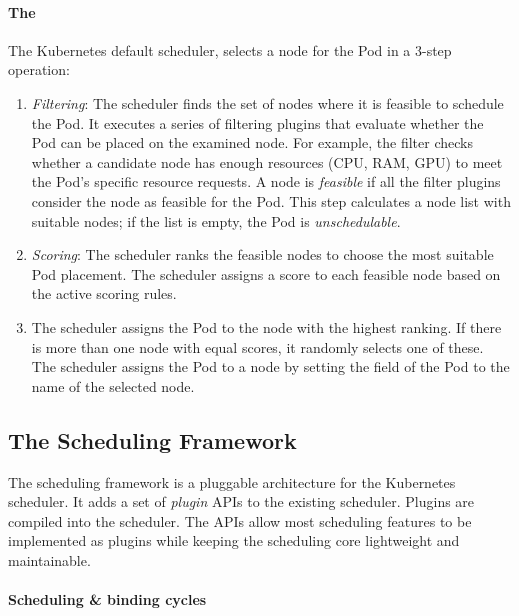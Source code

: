 \paragraph*{The } The Kubernetes default scheduler,
 selects a node for the Pod in a 3-step operation:
\begin{enumerate}
      \tightlist
      \item \textit{Filtering}: The scheduler finds the set of nodes where it is
            feasible to schedule the Pod. It executes a series of filtering
            plugins that evaluate whether the Pod can be placed on the examined
            node. For example, the  filter checks whether a
            candidate node has enough resources (CPU, RAM, GPU) to meet the
            Pod's specific resource requests. A node is \textit{feasible} if all
            the filter plugins consider the node as feasible for the Pod. This
            step calculates a node list with suitable nodes; if the list is
            empty, the Pod is \textit{unschedulable}.
      \item \textit{Scoring}: The scheduler ranks the feasible nodes to choose
            the most suitable Pod placement. The scheduler assigns a score to
            each feasible node based on the active scoring rules.
      \item The scheduler assigns the Pod to the node with the highest ranking.
            If there is more than one node with equal scores, it randomly
            selects one of these. The scheduler assigns the Pod to a node by
            setting the  field of the Pod to the name of the
            selected node.
\end{enumerate}


\subsection{The Scheduling
      Framework}\label{section:background_scheduling_framework}

The scheduling framework is a pluggable architecture for the Kubernetes
scheduler. It adds a set of \textit{plugin} APIs to the existing scheduler.
Plugins are compiled into the scheduler. The APIs allow most scheduling features
to be implemented as plugins while keeping the scheduling core lightweight and
maintainable.

\paragraph*{Scheduling \& binding cycles}

